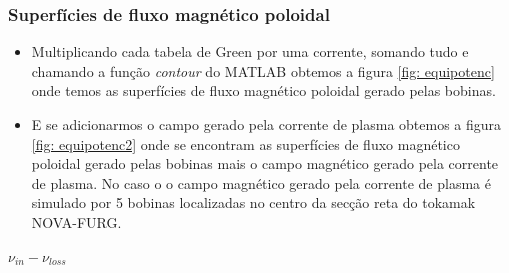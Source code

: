 \begin{frame}
\begin{frame}		
\frametitle{Superfícies de fluxo magnético poloidal  }
\begin{itemize}
\item Multiplicando  cada tabela de Green por uma corrente, somando tudo e chamando a função \textit{contour} do MATLAB obtemos a figura \ref{fig: equipotenc} onde temos as superfícies de fluxo magnético poloidal gerado pelas bobinas. 

\item E se adicionarmos o campo gerado pela corrente de plasma obtemos a figura \ref{fig: equipotenc2} onde se encontram as superfícies de fluxo magnético poloidal gerado pelas bobinas mais o campo magnético gerado pela corrente de plasma. No caso o o campo magnético gerado pela corrente de plasma é simulado por 5 bobinas localizadas no centro da secção reta do tokamak NOVA-FURG.
\end{itemize}
\end{frame}

$\nu_{in} - \nu_{loss}$ 

\end{frame}
